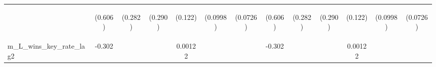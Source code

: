 \documentclass[]{article}
\begin{document}
\begin{center}
\begin{tabular}{lcccccccccccc}
\vspace{4pt} & \begin{footnotesize}(0.606)\end{footnotesize} & \begin{footnotesize}(0.282)\end{footnotesize} & \begin{footnotesize}(0.290)\end{footnotesize} & \begin{footnotesize}(0.122)\end{footnotesize} & \begin{footnotesize}(0.0998)\end{footnotesize} & \begin{footnotesize}(0.0726)\end{footnotesize} & \begin{footnotesize}(0.606)\end{footnotesize} & \begin{footnotesize}(0.282)\end{footnotesize} & \begin{footnotesize}(0.290)\end{footnotesize} & \begin{footnotesize}(0.122)\end{footnotesize} & \begin{footnotesize}(0.0998)\end{footnotesize} & \begin{footnotesize}(0.0726)\end{footnotesize} \\
m\_L\_wins\_key\_rate\_lag2 & -0.302 &  &  & 0.00122 &  &  & -0.302 &  &  & 0.00122 &  &  \\

\end{tabular}
\end{center}
\end{document}
